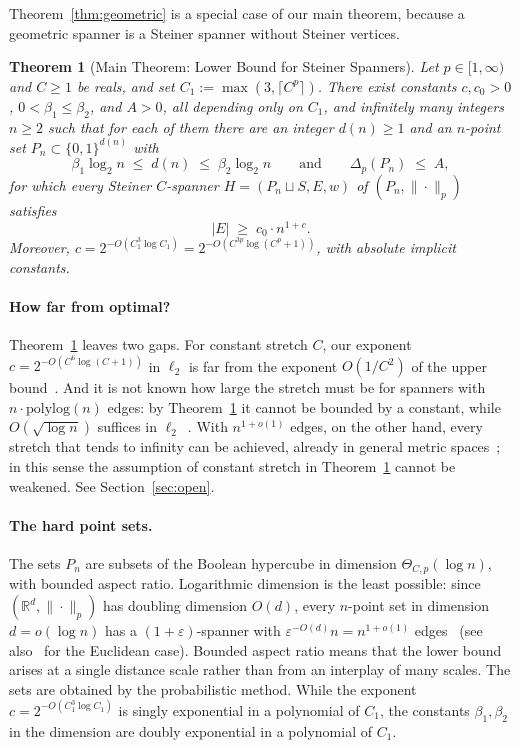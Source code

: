 \documentclass[11pt]{article}
\newtheorem{theorem}{Theorem}[section]
\theoremstyle{definition}
\theoremstyle{remark}
\newcommand{\R}{\mathbb{R}}
\begin{document}
Theorem~\ref{thm:geometric} is a special case of our main theorem, because a geometric spanner is a Steiner spanner without Steiner vertices.

\begin{theorem}[Main Theorem: Lower Bound for Steiner Spanners]
\label{thm:main}
Let $p \in [1, \infty)$ and $C \ge 1$ be reals, and set $C_1 := \max(3, \lceil C^p \rceil)$. There exist constants $c, c_0 > 0$, $0 < \beta_1 \le \beta_2$, and $A > 0$, all depending only on $C_1$, and infinitely many integers $n \ge 2$ such that for each of them there are an integer $d(n) \ge 1$ and an $n$-point set $P_n \subset \{0, 1\}^{d(n)}$ with
\[
\beta_1 \log_2 n \;\le\; d(n) \;\le\; \beta_2 \log_2 n \qquad \text{and} \qquad \Delta_p(P_n) \;\le\; A,
\]
for which every Steiner $C$-spanner $H = (P_n \sqcup S, E, w)$ of $(P_n, \|\cdot\|_p)$ satisfies
\[
|E| \;\ge\; c_0 \cdot n^{1 + c}.
\]
Moreover, $c = 2^{-O(C_1^3 \log C_1)} = 2^{-O(C^{3p}\log(C^p + 1))}$, with absolute implicit constants.
\end{theorem}

\paragraph{How far from optimal?}
Theorem~\ref{thm:main} leaves two gaps. For constant stretch $C$, our exponent $c = 2^{-O(C^6 \log(C + 1))}$ in $\ell_2$ is far from the exponent $O(1/C^2)$ of the upper bound~\cite{harpeled2013euclidean}. And it is not known how large the stretch must be for spanners with $n \cdot \mathrm{polylog}(n)$ edges: by Theorem~\ref{thm:main} it cannot be bounded by a constant, while $O(\sqrt{\log n})$ suffices in $\ell_2$~\cite{harpeled2013euclidean}. With $n^{1 + o(1)}$ edges, on the other hand, every stretch that tends to infinity can be achieved, already in general metric spaces~\cite{althofer1993sparse}; in this sense the assumption of constant stretch in Theorem~\ref{thm:main} cannot be weakened. See Section~\ref{sec:open}.

\paragraph{The hard point sets.}
The sets $P_n$ are subsets of the Boolean hypercube in dimension $\Theta_{C, p}(\log n)$, with bounded aspect ratio. Logarithmic dimension is the least possible: since $(\R^d, \|\cdot\|_p)$ has doubling dimension $O(d)$, every $n$-point set in dimension $d = o(\log n)$ has a $(1 + \varepsilon)$-spanner with $\varepsilon^{-O(d)} n = n^{1 + o(1)}$ edges~\cite{harpeled2006fast} (see also~\cite{arya1995euclidean,le2019truly} for the Euclidean case). Bounded aspect ratio means that the lower bound arises at a single distance scale rather than from an interplay of many scales. The sets are obtained by the probabilistic method. While the exponent $c = 2^{-O(C_1^3 \log C_1)}$ is singly exponential in a polynomial of $C_1$, the constants $\beta_1, \beta_2$ in the dimension are doubly exponential in a polynomial of $C_1$.
\end{document}
